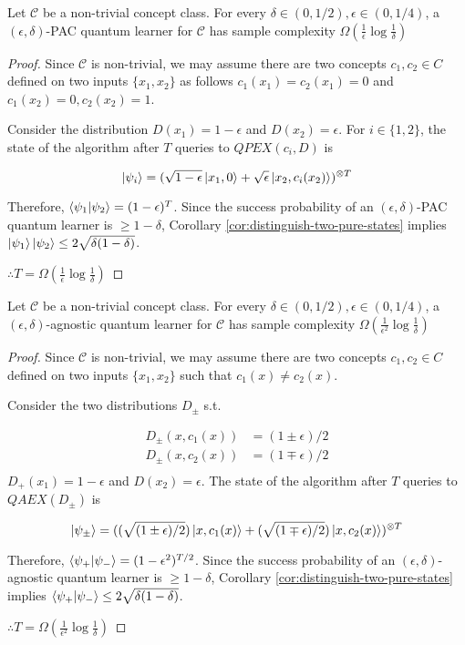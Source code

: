 \documentclass[main.tex]{subfiles}
\begin{document}
\begin{lemma}
Let $\mathcal{C}$ be a non-trivial concept class. For every $\delta \in (0,1/2), \epsilon \in (0,1/4)$, a $(\epsilon,\delta)$-PAC quantum learner for $\mathcal{C}$ has sample complexity $\Omega(\frac{1}{\epsilon}\log \frac{1}{\delta})$
\end{lemma}

\begin{proof} 
Since $\mathcal{C}$ is non-trivial, we may assume there are two concepts $c_1,c_2 \in C$ defined on two inputs $\{x_1,x_2\}$ as follows $c_1(x_1) = c_2(x_1) = 0$ and $c_1(x_2) = 0,c_2(x_2) = 1$.

 Consider the distribution $D(x_1) = 1−\epsilon$ and $D(x_2) = \epsilon$. For $i \in \{1,2\}$, the state of the algorithm after $T$ queries to $QPEX(c_i,D)$ is
 
 $$
 \ket{\psi_i} = (\sqrt{1-\epsilon}\ket{x_1, 0} + \sqrt{\epsilon}\ket{x_2, c_i(x_2)})^{\otimes T}
 $$
 
 Therefore, $\bra{\psi_1}\ket{\psi_2} = (1-\epsilon)^T$. Since the success probability of an $(\epsilon, \delta)$-PAC quantum learner is $\geq 1 - \delta$, Corollary \ref{cor:distinguish-two-pure-states} implies $\ket{\psi_1}\ket{\psi_2} \leq 2\sqrt{\delta(1-\delta)}$. 
 
 $\therefore T = \Omega(\frac{1}{\epsilon}\log \frac{1}{\delta})$
\end{proof}

\begin{lemma}
Let $\mathcal{C}$ be a non-trivial concept class. For every $\delta \in (0,1/2), \epsilon \in (0,1/4)$, a $(\epsilon,\delta)$-agnostic quantum learner for $\mathcal{C}$ has sample complexity $\Omega(\frac{1}{\epsilon^2}\log \frac{1}{\delta})$
\end{lemma}

\begin{proof}
Since $\mathcal{C}$ is non-trivial, we may assume there are two concepts $c_1,c_2 \in C$ defined on two inputs $\{x_1,x_2\}$ such that $c_1(x) \neq c_2(x)$.

 Consider the two distributions $D_\pm$ s.t.
 
 \begin{align*}
 	D_\pm(x, c_1(x)) &= (1 \pm \epsilon)/2\\
 	D_\pm(x, c_2(x)) &= (1 \mp \epsilon)/2\\
 \end{align*}
 $D_+(x_1) = 1−\epsilon$ and $D(x_2) = \epsilon$. The state of the algorithm after $T$ queries to $QAEX(D_\pm)$ is
 
 $$
 \ket{\psi_\pm} = ((\sqrt{(1\pm\epsilon)/2})\ket{x, c_1(x)} + (\sqrt{(1\mp\epsilon)/2})\ket{x, c_2(x)})^{\otimes T}
 $$
 
 Therefore, $\bra{\psi_+}\ket{\psi_-} = (1-\epsilon^2)^{T/2}$. Since the success probability of an $(\epsilon, \delta)$-agnostic quantum learner is $\geq 1 - \delta$, Corollary \ref{cor:distinguish-two-pure-states} implies $\bra{\psi_+}\ket{\psi_-} \leq 2\sqrt{\delta(1-\delta)}$. 
 
 $\therefore T = \Omega(\frac{1}{\epsilon^2}\log \frac{1}{\delta})$
\end{proof}
\end{document}
